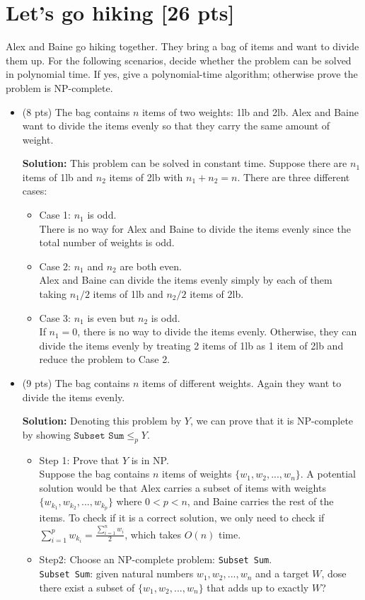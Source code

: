 \documentclass{article}
\begin{document}
\section{Let's go hiking [26 pts]}
Alex and Baine go hiking together. They bring a bag of items and want to divide them up. For the following scenarios, decide whether the problem can be solved in polynomial time. If yes, give a polynomial-time algorithm; otherwise prove the problem is NP-complete. 
\begin{itemize}
	\item (8 pts) The bag contains $n$ items of two weights: 1lb and 2lb. Alex and Baine want to divide the items evenly so that they carry the same amount of weight. 
	
\begin{tcolorbox}
{\bf Solution:} This problem can be solved in constant time. Suppose there are $n_1$ items of 1lb and $n_2$ items of 2lb with $n_1 + n_2 = n$. There are three different cases: 
\begin{itemize}
\item Case 1: $n_1$ is odd. \\
There is no way for Alex and Baine to divide the items evenly since the total number of weights is odd.
\item Case 2: $n_1$ and $n_2$ are both even. \\
Alex and Baine can divide the items evenly simply by each of them taking $n_1/2$ items of 1lb and $n_2/2$ items of 2lb.
\item Case 3: $n_1$ is even but $n_2$ is odd. \\
If $n_1 = 0$, there is no way to divide the items evenly. Otherwise, they can divide the items evenly by treating 2 items of 1lb as 1 item of 2lb and reduce the problem to Case 2.
\end{itemize}
\end{tcolorbox}
\newpage	
	\item (9 pts) The bag contains $n$ items of different weights. Again they want to divide the items evenly. 
\begin{tcolorbox}
{\bf Solution:} Denoting this problem by $Y$, we can prove that it is NP-complete by showing $\texttt{Subset Sum} \leq_p  Y$.
\begin{itemize}
\item Step 1: Prove that $Y$ is in NP. \\
Suppose the bag contains $n$ items of weights $\{w_1, w_2, ..., w_n\}$. A potential solution would be that Alex carries a subset of items with weights $\{w_{k_1}, w_{k_2}, ..., w_{k_p} \}$ where $0 < p < n$, and Baine carries the rest of the items. To check if it is a correct solution, we only need to check if $\sum_{i=1}^p w_{k_i} = \frac {\sum_{i=1}^n w_i }{2}$, which takes $O(n)$ time.
\item Step2: Choose an NP-complete problem:  \texttt{Subset Sum}. \\
 \texttt{Subset Sum}: given natural numbers $w_1, w_2, ..., w_n$ and a target $W$, dose there exist a subset of $\{w_1, w_2, ..., w_n\}$ that adds up to exactly $W$?
 

\end{itemize}
\end{tcolorbox}
\end{itemize}
\end{document}
